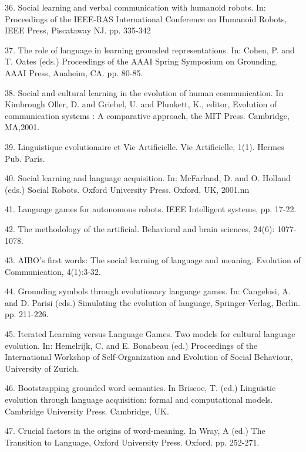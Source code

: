 36. \citet{Steels:01a} Social learning and verbal communication with humanoid robots. In: Proceedings of the IEEE-RAS International Conference on Humanoid Robots, IEEE Press, Piscataway NJ. pp. 335-342

37. \citet{Steels:01b} The role of language in learning grounded representations. In: Cohen, P. and T. Oates (eds.) Proceedings of the AAAI Spring Symposium on Grounding. AAAI Press, Anaheim, CA. pp. 80-85. 

38. \citet{Steels:01c} Social and cultural learning in the evolution of human communication. In Kimbrough Oller, D. and Griebel, U. and Plunkett, K., editor, Evolution of communication systems : A comparative approach, the MIT Press. Cambridge, MA,2001.

39. \citet{Steels:01d} Linguistique evolutionaire et Vie Artificielle. Vie Artificielle, 1(1). Hermes Pub. Paris. 

40. \citet{Steels:01e} Social learning and language acquisition. In: McFarland, D. and  O. Holland (eds.) Social Robots. 
Oxford University Press. Oxford, UK, 2001.nn

41. \citet{Steels:01f} Language games for autonomous robots. IEEE Intelligent systems, pp. 17-22. 

42. \citet{Steels:01g} The methodology of the artificial. Behavioral and brain sciences, 24(6): 1077-1078. 

43. \citet{Steels:01h} AIBO's first words: The social learning of language and meaning. 
Evolution of Communication, 4(1):3-32. 

44. \citet{Steels:02b} Grounding symbols through evolutionary language games. In: Cangelosi, A. and D. Parisi (eds.) 
Simulating the evolution of language, Springer-Verlag, Berlin. pp. 211-226. 

45. \citet{Steels:02c} Iterated Learning versus Language Games. Two models for cultural language evolution. In: Hemelrijk, C. and 
E. Bonabeau (ed.) Proceedings of the International Workshop of Self-Organization and Evolution of 
Social Behaviour, University of Zurich. 

46. \citet{Steels:02d} Bootstrapping grounded word semantics. In Briscoe, T. (ed.) Linguistic evolution through 
language acquisition: formal and computational models. Cambridge University Press. Cambridge, UK. 

47. \citet{Steels:02e} Crucial factors in the origins of word-meaning. In Wray, A (ed.)
The Transition to Language, Oxford University Press. Oxford. pp. 252-271.  

